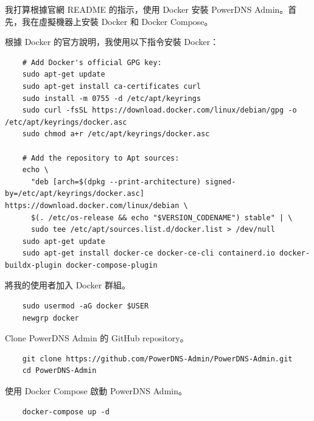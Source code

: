 \item 我打算根據官網 README 的指示，使用 Docker 安裝 PowerDNS Admin。首先，我在虛擬機器上安裝 Docker 和 Docker Compose。
\item 根據 Docker 的官方說明，我使用以下指令安裝 Docker：
  \begin{verbatim}
    # Add Docker's official GPG key:
    sudo apt-get update
    sudo apt-get install ca-certificates curl
    sudo install -m 0755 -d /etc/apt/keyrings
    sudo curl -fsSL https://download.docker.com/linux/debian/gpg -o /etc/apt/keyrings/docker.asc
    sudo chmod a+r /etc/apt/keyrings/docker.asc

    # Add the repository to Apt sources:
    echo \
      "deb [arch=$(dpkg --print-architecture) signed-by=/etc/apt/keyrings/docker.asc] https://download.docker.com/linux/debian \
      $(. /etc/os-release && echo "$VERSION_CODENAME") stable" | \
      sudo tee /etc/apt/sources.list.d/docker.list > /dev/null
    sudo apt-get update
    sudo apt-get install docker-ce docker-ce-cli containerd.io docker-buildx-plugin docker-compose-plugin
  \end{verbatim}
\item 將我的使用者加入 Docker 群組。
  \begin{verbatim}
    sudo usermod -aG docker $USER
    newgrp docker
  \end{verbatim}
\item Clone PowerDNS Admin 的 GitHub repository。
  \begin{verbatim}
    git clone https://github.com/PowerDNS-Admin/PowerDNS-Admin.git
    cd PowerDNS-Admin
  \end{verbatim}
\item 使用 Docker Compose 啟動 PowerDNS Admin。
  \begin{verbatim}
    docker-compose up -d
  \end{verbatim}

